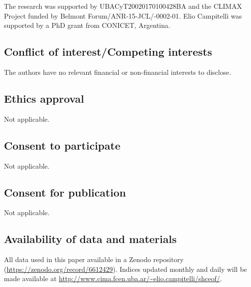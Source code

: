 \documentclass[pdflatex,sn-basic]{sn-jnl}
\theoremstyle{thmstyleone}%
\theoremstyle{thmstyletwo}%
\theoremstyle{thmstylethree}%
\begin{document}
The research was supported by UBACyT20020170100428BA and the CLIMAX Project funded by Belmont Forum/ANR-15-JCL/-0002-01. Elio Campitelli was supported by a PhD grant from CONICET, Argentina.

\hypertarget{conflict-of-interestcompeting-interests}{%
\subsection*{Conflict of interest/Competing interests}\label{conflict-of-interestcompeting-interests}}

The authors have no relevant financial or non-financial interests to disclose.

\hypertarget{ethics-approval}{%
\subsection*{Ethics approval}\label{ethics-approval}}

Not applicable.

\hypertarget{consent-to-participate}{%
\subsection*{Consent to participate}\label{consent-to-participate}}

Not applicable.

\hypertarget{consent-for-publication}{%
\subsection*{Consent for publication}\label{consent-for-publication}}

Not applicable.

\hypertarget{availability-of-data-and-materials}{%
\subsection*{Availability of data and materials}\label{availability-of-data-and-materials}}

All data used in this paper available in a Zenodo repository \citep{campitelli2022a} (\url{https://zenodo.org/record/6612429}).
Indices updated monthly and daily will be made available at \url{http://www.cima.fcen.uba.ar/~elio.campitelli/shceof/}.
\end{document}
